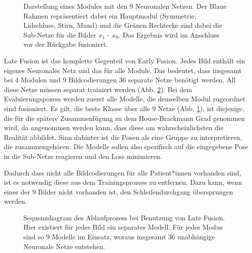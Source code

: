 \begin{figure}[b]
\begin{tikzpicture}[->,>=stealth',shorten >=1pt,auto,node distance=2.5cm,semithick]
\end{tikzpicture}
\caption[Darstellung eines Modules mit den 9 Neuronalen Netzen]{Darstellung eines Modules mit den 9 Neuronalen Netzen. Der Blaue Rahmen repräsentiert dabei ein Hauptmodul (Symmetrie, Lidschluss, Stirn, Mund) und die Grünen Rechtecke sind dabei die Sub-Netze für die Bilder $x_1$ - $x_9$. Das Ergebnis wird im Anschluss vor der Rückgabe fusioniert.}\label{cap:mod_lf}
\end{figure}\label{fig:mod_lf}


Late Fusion ist das komplette Gegenteil von Early Fusion. Jedes Bild enthält ein eigenes Neuronales Netz und das für alle Module. Das bedeutet, dass insgesamt bei 4 Modulen und 9 Bildcodierungen 36 separate Netze benötigt werden. All diese Netze müssen separat trainiert werden (Abb. \ref{cap:late}). Bei dem Evaluierungspozess werden zuerst alle Modelle, die demselben Modul zugeordnet sind fusioniert. Es gilt, die beste Klasse über alle 9 Netze (Abb. \ref{cap:mod_lf}), ist diejenige, die für die spätere Zusammenfügung zu dem House-Brackmann Grad genommen wird, da angenommen werden kann, dass diese am wahrscheinlichsten die Realität abbildet. Sinn dahinter ist die Posen als eine Gruppe zu interpretieren, die zusammengehören. Die Modelle sollen also spezifisch auf die eingegebene Pose in die Sub-Netze reagieren und den Loss minimieren.

Dadurch dass nicht alle Bildcodierungen für alle Patient*innen vorhanden sind, ist es notwendig diese aus dem Trainingsprozess zu entfernen. Dazu kann, wenn eines der 9 Bilder nicht vorhanden ist, den Schleifendurchgang übersprungen werden.



\begin{figure}[!t]\centering
\makebox[0pt]{}
\caption[Sequenzdiagram des Ablaufprozess bei Benutzung von Late Fusion]{Sequenzdiagram des Ablaufprozess bei Benutzung von Late Fusion. Hier existiert für jedes Bild ein separates Modell. Für jedes Modus sind so 9 Modelle im Einsatz, woraus insgesamt 36 unabhängige Neuronale Netze entstehen.}\label{cap:late}
\end{figure}\label{fig:late}






































